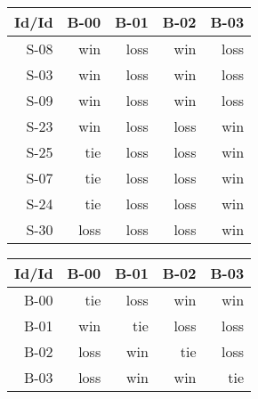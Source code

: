 \begin{tabular}{ | r | r | r | r | r | }
    \hline
        Id/Id  &   B-00  &   B-01  &   B-02  &   B-03  \\
    \hline
    \hline
         S-08  &    win  &   loss  &    win  &   loss  \\
    \hline
         S-03  &    win  &   loss  &    win  &   loss  \\
    \hline
         S-09  &    win  &   loss  &    win  &   loss  \\
    \hline
         S-23  &    win  &   loss  &   loss  &    win  \\
    \hline
         S-25  &    tie  &   loss  &   loss  &    win  \\
    \hline
         S-07  &    tie  &   loss  &   loss  &    win  \\
    \hline
         S-24  &    tie  &   loss  &   loss  &    win  \\
    \hline
         S-30  &   loss  &   loss  &   loss  &    win  \\
    \hline
\end{tabular}


\begin{tabular}{ | r | r | r | r | r | }
    \hline
        Id/Id  &   B-00  &   B-01  &   B-02  &   B-03  \\
    \hline
    \hline
         B-00  &    tie  &   loss  &    win  &    win  \\
    \hline
         B-01  &    win  &    tie  &   loss  &   loss  \\
    \hline
         B-02  &   loss  &    win  &    tie  &   loss  \\
    \hline
         B-03  &   loss  &    win  &    win  &    tie  \\
    \hline
\end{tabular}




